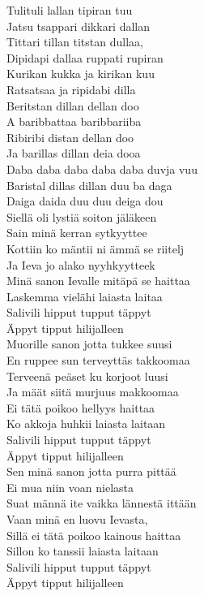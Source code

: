  Tulituli lallan tipiran tuu\\
 Jatsu tsappari dikkari dallan\\
 Tittari tillan titstan dullaa,\\
 Dipidapi dallaa ruppati rupiran\\
 Kurikan kukka ja kirikan kuu\\
\hops
{} Ratsatsaa ja ripidabi dilla\\
 Beritstan dillan dellan doo\\
 A baribbattaa baribbariiba\\
 Ribiribi distan dellan doo\\
 Ja barillas dillan deia dooa\\
 Daba daba daba daba daba duvja vuu\\
 Baristal dillas dillan duu ba daga\\
 Daiga daida duu duu deiga dou\\
\hops
Siellä oli lystiä soiton jäläkeen\\
Sain minä kerran sytkyyttee\\
Kottiin ko mäntii ni ämmä se riitelj\\
Ja Ieva jo alako nyyhkyytteek\\
Minä sanon Ievalle mitäpä se haittaa\\
Laskemma vielähi laiasta laitaa\\
Salivili hipput tupput täppyt\\
Äppyt tipput hilijalleen\\
\hops
Muorille sanon jotta tukkee suusi\\
En ruppee sun terveyttäs takkoomaa\\
Terveenä peäset ku korjoot luusi\\
Ja määt siitä murjuus makkoomaa\\
Ei tätä poikoo hellyys haittaa\\
Ko akkoja huhkii laiasta laitaan\\
Salivili hipput tupput täppyt\\
Äppyt tipput hilijalleen\\
\hops
Sen minä sanon jotta purra pittää\\
Ei mua niin voan nielasta\\
Suat männä ite vaikka lännestä ittään\\
Vaan minä en luovu Ievasta,\\
Sillä ei tätä poikoo kainous haittaa\\
Sillon ko tanssii laiasta laitaan\\
Salivili hipput tupput täppyt\\
Äppyt tipput hilijalleen